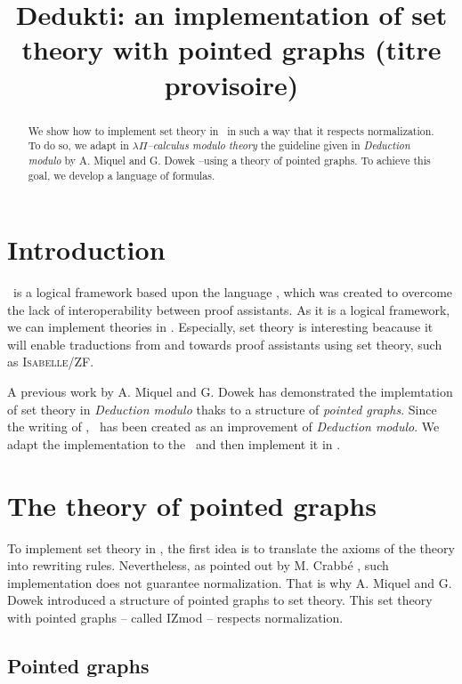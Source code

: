 \documentclass[a4paper]{article}
\title{\textbf{Dedukti: an implementation of set theory with pointed graphs} (titre provisoire)}
\date{}
\begin{document}
\thispagestyle{empty}
\maketitle

\begin{abstract}
We show how to implement set theory in \dedukti ~in such a way that it respects normalization. To do so, we adapt in $\lambda \Pi$\textit{--calculus modulo theory} the guideline given in \textit{Deduction modulo} by A. Miquel and G. Dowek --using a theory of pointed graphs. To achieve this goal, we develop a language of formulas.
\end{abstract}

\section{Introduction}

\dedukti \ is a logical framework based upon the language \lpcm, which was created to overcome the lack of interoperability between proof assistants. As it is a logical framework, we can implement theories in \dedukti. Especially, set theory is interesting beacause it will enable traductions from and towards proof assistants using set theory, such as \textsc{Isabelle/ZF}.

A previous work by A. Miquel and G. Dowek \cite{zermodulo} has demonstrated the implemtation of set theory in \textit{Deduction modulo} thaks to a structure of \textit{pointed graphs}. Since the writing of \cite{zermodulo}, \lpcm \ has been created as an improvement of \textit{Deduction modulo}. We adapt the implementation to the \lpcm \ and then implement it in \dedukti. 

\section{The theory of pointed graphs}

To implement set theory in \dedukti, the first idea is to translate the axioms of the theory into rewriting rules. Nevertheless, as pointed out by M. Crabbé \cite{crabbé}, such implementation does not guarantee normalization. That is why A. Miquel and G. Dowek \cite{zermodulo} introduced a structure of pointed graphs to set theory. This set theory with pointed graphs -- called IZmod -- respects normalization.

\subsection{Pointed graphs}
\end{document}
